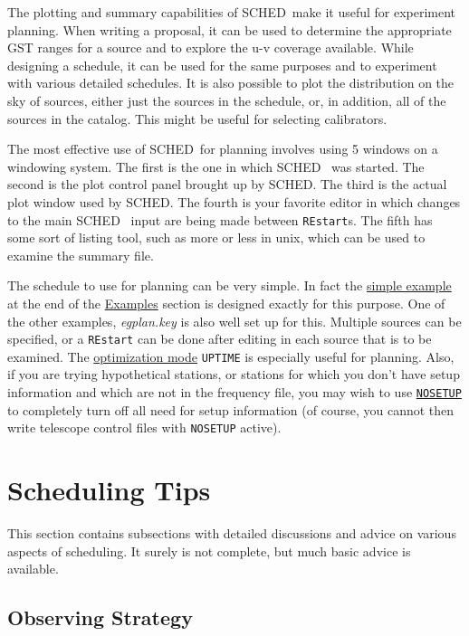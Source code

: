 \documentclass{report}
\newcommand{\sched}{{\sc SCHED}}
\newcommand{\schedb}{{\sc SCHED~}}
\begin{document}
The plotting and summary capabilities of \schedb make it useful for
experiment planning.  When writing a proposal, it can be used to
determine the appropriate GST ranges for a source and to explore the
u-v coverage available.  While designing a schedule, it can be used
for the same purposes and to experiment with various detailed
schedules.  It is also possible to plot the distribution on the sky of
sources, either just the sources in the schedule, or, in addition, all
of the sources in the catalog.  This might be useful for selecting
calibrators.

The most effective use of \schedb for planning involves using 5
windows on a windowing system.  The first is the one in which \schedb
was started.  The second is the plot control panel brought up by
\sched.  The third is the actual plot window used by \sched.  The
fourth is your favorite editor in which changes to the main \schedb
input are being made between {\tt REstart}s.  The fifth has some sort
of listing tool, such as {\sc more} or {\sc less} in unix, which can
be used to examine the summary file.

The schedule to use for planning can be very simple.  In fact the
{\hyperref[SSEC:EXAMPLE3]{simple example}} at the end of the 
{\hyperref[SEC:EXAMPLES]{Examples}}
section is designed exactly for this purpose.
One of the other examples, {\sl egplan.key} is also well set up for this.
Multiple sources can be specified, or a {\tt REstart}
can be done after editing in each source that is to be examined.  The
{\hyperref[MP:OPTMODE]{optimization mode}} {\tt UPTIME} is especially useful
for planning.  Also, if you are trying hypothetical stations, or stations
for which you don't have setup information and which are not in the
frequency file, you may wish to use 
{\hyperref[MP:NOSETUP]{{\tt NOSETUP}}}
to completely turn off all need for setup information (of course, you
cannot then write telescope control files with {\tt NOSETUP} active).

\section{\label{SEC:TIPS}Scheduling Tips}

This section contains subsections with detailed discussions and
advice on various aspects of scheduling.  It surely is not complete, but
much basic advice is available.

\subsection{\label{SSEC:STRATEGY}Observing Strategy}
\end{document}
